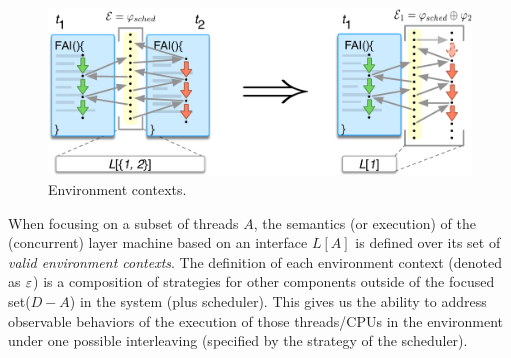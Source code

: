 \begin{figure}[t]
\centering
\includegraphics[scale=0.6]{figs/ccal/pcomp}
\caption{Environment contexts.}
\label{fig:chapter:ccal:env-contexs}
\end{figure}

When focusing on a subset of threads $A$, the semantics (or execution) of the (concurrent) layer machine based on an
interface $L[A]$ is defined over its set of \emph{valid environment
contexts}. 
The definition of each  environment context (denoted as $\oracle$) is
a composition  of strategies for other components outside of the focused set($D - A$) in the 
system (plus scheduler).
This gives us the ability to address observable behaviors of the
execution of those threads/CPUs in the environment under one possible
interleaving (specified by the strategy of the scheduler).

